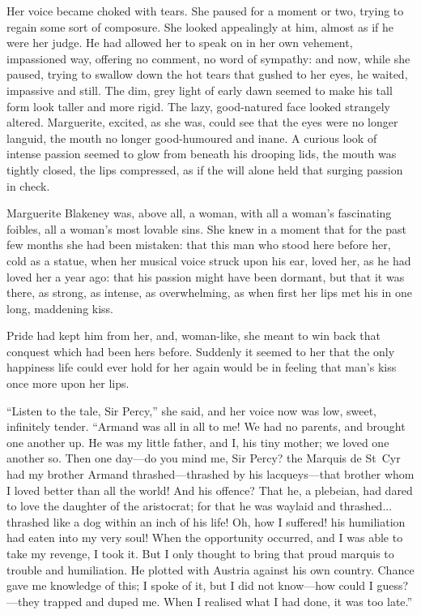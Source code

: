 Her voice became choked with tears. She paused for a moment or two, trying to regain some sort of composure. She looked appealingly at him, almost as if he were her judge. He had allowed her to speak on in her own vehement, impassioned way, offering no comment, no word of sympathy: and now, while she paused, trying to swallow down the hot tears that gushed to her eyes, he waited, impassive and still. The dim, grey light of early dawn seemed to make his tall form look taller and more rigid. The lazy, good-natured face looked strangely altered. Marguerite, excited, as she was, could see that the eyes were no longer languid, the mouth no longer good-humoured and inane. A curious look of intense passion seemed to glow from beneath his drooping lids, the mouth was tightly closed, the lips compressed, as if the will alone held that surging passion in check.

Marguerite Blakeney was, above all, a woman, with all a woman's fascinating foibles, all a woman's most lovable sins. She knew in a moment that for the past few months she had been mistaken: that this man who stood here before her, cold as a statue, when her musical voice struck upon his ear, loved her, as he had loved her a year ago: that his passion might have been dormant, but that it was there, as strong, as intense, as overwhelming, as when first her lips met his in one long, maddening kiss.

Pride had kept him from her, and, woman-like, she meant to win back that conquest which had been hers before. Suddenly it seemed to her that the only happiness life could ever hold for her again would be in feeling that man's kiss once more upon her lips.

\enquote{Listen to the tale, Sir Percy,} she said, and her voice now was low, sweet, infinitely tender. \enquote{Armand was all in all to me! We had no parents, and brought one another up. He was my little father, and I, his tiny mother; we loved one another so. Then one day---do you mind me, Sir Percy? the Marquis de St~Cyr had my brother Armand thrashed---thrashed by his lacqueys---that brother whom I loved better than all the world! And his offence? That he, a plebeian, had dared to love the daughter of the aristocrat; for that he was waylaid and thrashed... thrashed like a dog within an inch of his life! Oh, how I suffered! his humiliation had eaten into my very soul! When the opportunity occurred, and I was able to take my revenge, I took it. But I only thought to bring that proud marquis to trouble and humiliation. He plotted with Austria against his own country. Chance gave me knowledge of this; I spoke of it, but I did not know---how could I guess?---they trapped and duped me. When I realised what I had done, it was too late.}

